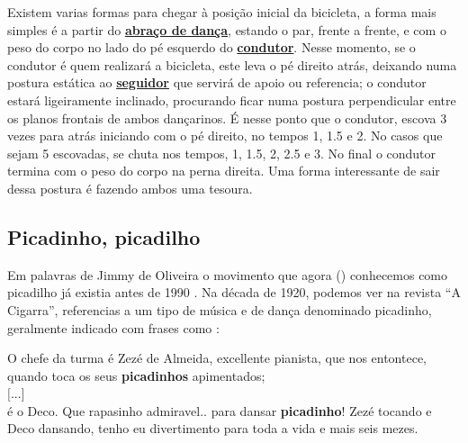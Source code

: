 Existem varias formas para chegar à posição inicial da bicicleta,  
a forma mais simples é a partir do \hyperref[def:abracodedanca]{\textbf{abraço de dança}},
estando o par, frente a frente, 
e com o peso do corpo no lado do pé esquerdo do \hyperref[def:Condutor]{\textbf{condutor}}.
Nesse momento, se o condutor é quem realizará a bicicleta, 
este leva o pé direito atrás,
deixando numa postura estática ao \hyperref[def:Seguidor]{\textbf{seguidor}} 
que servirá de apoio ou referencia;   
o condutor estará ligeiramente inclinado,
procurando ficar numa postura perpendicular entre os planos frontais de ambos dançarinos.
É nesse ponto que o condutor, escova 3 vezes para atrás iniciando com o pé direito,
no tempos 1, 1.5 e 2. No casos que sejam 5 escovadas, se chuta nos tempos,
1, 1.5, 2, 2.5 e 3. No final o condutor termina com o peso do corpo na perna direita.
Uma forma interessante de sair dessa postura é fazendo ambos uma tesoura.\\


\subsection{ Picadinho, picadilho}


Em palavras de Jimmy de Oliveira o movimento que agora (\AnoLivro) conhecemos como picadilho 
já existia antes de 1990 \cite{sambafunkeadoJimmyDeOliveiraPart1}.
Na década de 1920, podemos ver na revista ``A Cigarra'', 
referencias a um tipo de música e de dança denominado picadinho,
geralmente indicado com frases como \cite[pp. 13]{picadinho1}:
\begin{citando}
O chefe da turma é Zezé de Almeida, excellente pianista,
que nos entontece, quando toca os seus \textbf{picadinhos} apimentados;~\\
$[$...$]$~\\
é o Deco. Que rapasinho admiravel.. para dansar \textbf{picadinho}! 
Zezé tocando e Deco dansando, tenho eu divertimento 
para toda a vida e mais seis mezes.
\end{citando}


